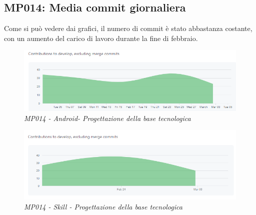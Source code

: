 \subsection{MP014: Media commit giornaliera}
Come si può vedere dai grafici, il numero di commit è stato abbastanza costante, con un aumento del carico di lavoro durante la fine di febbraio.
\begin{figure} [h]
    \centering
	\includegraphics[scale=0.5]{./images/dailycommits_kotlin.PNG}
    \caption{\textit{MP014 - Android- Progettazione della base tecnologica}}\label{}
\end{figure}
\begin{figure} [h]
    \centering
	\includegraphics[scale=0.5]{./images/daycommits_js.PNG}
    \caption{\textit{MP014 - Skill - Progettazione della base tecnologica}}\label{}
\end{figure}

